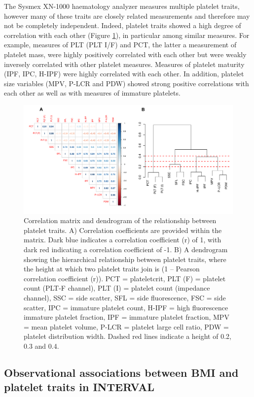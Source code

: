 \documentclass[11pt,twoside]{bristolthesis}
\begin{document}
The Sysmex XN-1000 haematology analyzer measures multiple platelet traits, however many of these traits are closely related measurements and therefore may not be completely independent. Indeed, platelet traits showed a high degree of correlation with each other (Figure \ref{fig:Corr-mat-dend}), in particular among similar measures. For example, measures of PLT (PLT I/F) and PCT, the latter a measurement of platelet mass, were highly positively correlated with each other but were weakly inversely correlated with other platelet measures. Measures of platelet maturity (IPF, IPC, H-IPF) were highly correlated with each other. In addition, platelet size variables (MPV, P-LCR and PDW) showed strong positive correlations with each other as well as with measures of immature platelets.
\begin{figure}
\includegraphics[width=0.95\linewidth]{figure/BMI_platelets/Corrmatrix_dendrogram} \caption[Correlation matrix and dendrogram of the relationship between platelet traits]{Correlation matrix and dendrogram of the relationship between platelet traits. A) Correlation coefficients are provided within the matrix. Dark blue indicates a correlation coefficient (r) of 1, with dark red indicating a correlation coefficient of -1. B) A dendrogram showing the hierarchical relationship between platelet traits, where the height at which two platelet traits join is (1 – Pearson correlation coefficient (r)). PCT = plateletcrit, PLT (F) = platelet count (PLT-F channel), PLT (I) = platelet count (impedance channel), SSC = side scatter, SFL = side fluorescence, FSC = side scatter, IPC = immature platelet count, H-IPF = high fluorescence immature platelet fraction, IPF = immature platelet fraction, MPV = mean platelet volume, P-LCR = platelet large cell ratio, PDW = platelet distribution width. Dashed red lines indicate a height of 0.2, 0.3 and 0.4.}\label{fig:Corr-mat-dend}
\end{figure}
\hypertarget{observational-associations-between-bmi-and-platelet-traits-in-interval}{%
\subsection{Observational associations between BMI and platelet traits in INTERVAL}\label{observational-associations-between-bmi-and-platelet-traits-in-interval}}
\end{document}
